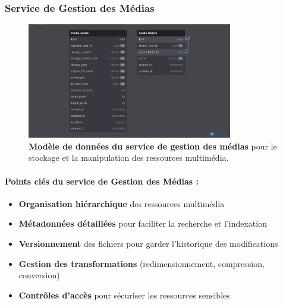 \subsubsection{Service de Gestion des Médias}
\begin{figure}[p]
  \centering
  \includegraphics[width=0.8\textwidth,keepaspectratio]{week_1_img/services_db_screanshots/Screenshot 2025-06-06 at 15-08-27 Media_Management_Service.pdf.png}
  \caption{\textbf{Modèle de données du service de gestion des médias} pour le stockage et la manipulation des ressources multimédia.}
  \label{fig:media_service}
\end{figure}

\vspace{5pt}
\small
\paragraph{Points clés du service de Gestion des Médias :}
\begin{itemize}[leftmargin=*,noitemsep,topsep=0pt]
  \item \textbf{Organisation hiérarchique} des ressources multimédia
  \item \textbf{Métadonnées détaillées} pour faciliter la recherche et l'indexation
  \item \textbf{Versionnement} des fichiers pour garder l'historique des modifications
  \item \textbf{Gestion des transformations} (redimensionnement, compression, conversion)
  \item \textbf{Contrôles d'accès} pour sécuriser les ressources sensibles
\end{itemize}
\normalsize
\clearpage

